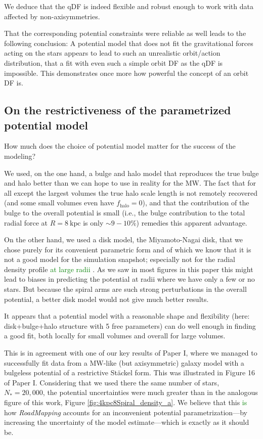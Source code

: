 \documentclass[iop,revtex4,numberedappendix,appendixfloats]{emulateapj}
\newcommand{\RM}{{\sl RoadMapping}}
\newcommand{\NEW}[1]{\textcolor{Green}{#1}}
\newcommand{\OLD}[1]{}
\begin{document}
We deduce that the qDF is indeed flexible and robust enough to work with data affected by non-axisymmetries.

That the corresponding potential constraints were reliable as well leads to the following conclusion: A potential model that does not fit the gravitational forces acting on the stars appears to lead to such an unrealistic orbit/action distribution, that a fit with even such a simple orbit DF as the qDF is impossible. This demonstrates once more how powerful the concept of an orbit DF is.

\subsection{On the restrictiveness of the parametrized potential model}

How much does the choice of potential model matter for the success of the modeling?

We used, on the one hand, a bulge and halo model that reproduces the true bulge and halo better than we can hope to use in reality for the MW. The fact that for all except the largest volumes the true halo scale length is not remotely recovered (and some small volumes even have $f_\text{halo}=0$), and that the contribution of the bulge to the overall potential is small (i.e., the bulge contribution to the total radial force at $R=8~\text{kpc}$ is only $\sim 9-10\%$) remedies this apparent advantage. 

On the other hand, we used a disk model, the Miyamoto-Nagai disk, that we chose purely for its convenient parametric form and of which we know that it is not a good model for the simulation snapshot; especially not for the radial density profile \NEW{at large radii \citep{2015MNRAS.448.2934S}}. As we saw in most figures in this paper this might lead to biases in predicting the potential at radii where we have only a few or no stars. But because the spiral arms are such strong perturbations in the overall potential, a better disk model would \OLD{probably} not give much better results.

It appears that a potential model with a reasonable shape and flexibility (here: disk+bulge+halo structure with 5 free parameters) can do well enough in finding a good fit, both locally for small volumes and overall for large volumes.

This is in agreement with one of our key results of Paper I, where we managed to successfully fit data from a MW-like (but axisymmetric) galaxy model with a bulgeless potential of a restrictive St\"ackel form. This was illustrated in Figure 16 of Paper I. Considering that we used there the same number of stars, $N_*=20,000$, the potential uncertainties were much greater than in the analogous figure of this work, Figure \ref{fig:4kpc8Spiral_density_a}. We believe that this \NEW{is} how \RM{} accounts for an inconvenient potential parametrization---by increasing the uncertainty of the model estimate---which is exactly as it should be.
\end{document}
